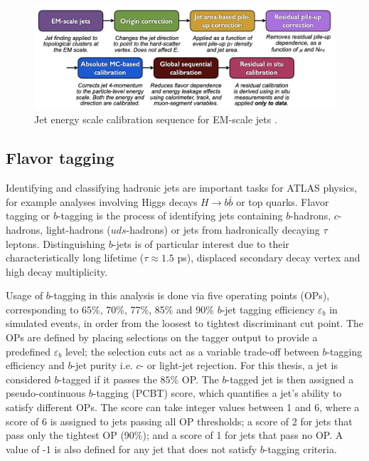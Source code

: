 \documentclass[../thesis.tex]{subfiles}
\begin{document}
\begin{figure}[!htbp]
\begin{center}
\includegraphics[width=\linewidth]{fig/reco_jet_jes_calib.png}
\caption[Jet energy scale calibration sequence for EM-scale jets.]{\label{fig:reco:jet_jes_calib}Jet energy scale calibration sequence for \acs{EM}-scale jets \citep{reco:jet_jes}.}
\end{center}
\end{figure}

\subsection{Flavor tagging}
\label{sec:ftag}
Identifying and classifying hadronic jets are important tasks for ATLAS physics, for example analyses involving Higgs decays $H\rightarrow b\bar{b}$ or top quarks. Flavor tagging or $b$-tagging is the process of identifying jets containing $b$-hadrons, $c$-hadrons, light-hadrons ($uds$-hadrons) or jets from hadronically decaying $\tau$ leptons. Distinguishing $b$-jets is of particular interest due to their characteristically long lifetime ($\tau\approx 1.5$ ps), displaced secondary decay vertex and high decay multiplicity.

Usage of $b$-tagging in this analysis is done via five operating points (\acs{OP}s), corresponding to 65\%, 70\%, 77\%, 85\% and 90\% $b$-jet tagging efficiency $\varepsilon_b$ in simulated \ttbar events, in order from the loosest to tightest discriminant cut point.
The \acs{OP}s are defined by placing selections on the tagger output to provide a predefined $\varepsilon_b$ level; the selection cuts act as a variable trade-off between $b$-tagging efficiency and $b$-jet purity i.e. $c$- or light-jet rejection. For this thesis, a jet is considered $b$-tagged if it passes the $85\%$ \acs{OP}. The $b$-tagged jet is then assigned a pseudo-continuous $b$-tagging (\acs{PCBT}) score, which quantifies a jet's ability to satisfy different \acs{OP}s. The score can take integer values between 1 and 6, where a score of 6 is assigned to jets passing all \acs{OP} thresholds; a score of 2 for jets that pass only the tightest OP (90\%); and a score of 1 for jets that pass no \acs{OP}. A value of -1 is also defined for any jet that does not satisfy $b$-tagging criteria. 
\end{document}
